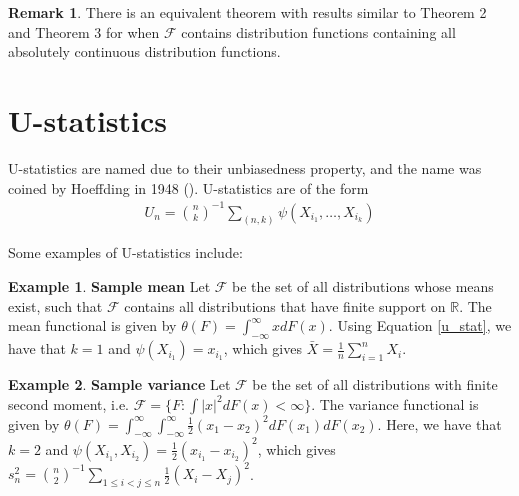 \documentclass{article}
\newcommand{\R}{{\mathbb{R}}}
\theoremstyle{definition}
\numberwithin{Def}{section}
\newtheorem{ex}{Example}
\newtheorem{Rmk}{Remark}
\begin{document}
 \begin{Rmk}
 There is an equivalent theorem with results similar to Theorem 2 and Theorem 3 for when $\mathcal{F}$ contains distribution functions containing all absolutely continuous distribution functions. 
 \end{Rmk}
 
    \section{U-statistics}
    U-statistics are named due to their unbiasedness property, and the name was coined by Hoeffding in 1948 (\cite{hoeffding1948}). U-statistics are of the form 
    \begin{align}\label{u_stat}
        U_n = {n \choose k}^{-1}\sum_{(n,k)}\psi(X_{i_1}, \dotsc, X_{i_k})
    \end{align}

Some examples of U-statistics include:
\begin{ex}\textbf{Sample mean}
Let $\mathcal{F}$ be the set of all distributions whose means exist, such that $\mathcal{F}$ contains all distributions that have finite support on $\R$. The mean functional is given by $\theta(F) = \int_{-\infty}^{\infty} x dF(x)$. Using Equation \ref{u_stat}, we have that $k=1$ and $\psi(X_{i_1}) = x_{i_1}$, which gives $\bar{X} = \frac{1}{n}\sum_{i=1}^n X_i$.
\end{ex}

\begin{ex}\textbf{Sample variance}
Let $\mathcal{F}$ be the set of all distributions with finite second moment, i.e. $\mathcal{F} = \{F: \int |x|^2 dF(x)<\infty\}$. The variance functional is given by $\theta(F) = \int_{-\infty}^{\infty} \int_{-\infty}^{\infty} \frac{1}{2}(x_1 - x_2)^2 dF(x_1)dF(x_2)$. Here, we have that $k=2$ and $\psi(X_{i_1}, X_{i_2}) = \frac{1}{2}(x_{i_1} - x_{i_2})^2$, which gives $s_n^2 = {n \choose 2}^{-1}\sum_{1 \leq i < j \leq n}\frac{1}{2}(X_i - X_j)^2$.
\end{ex}
\end{document}
